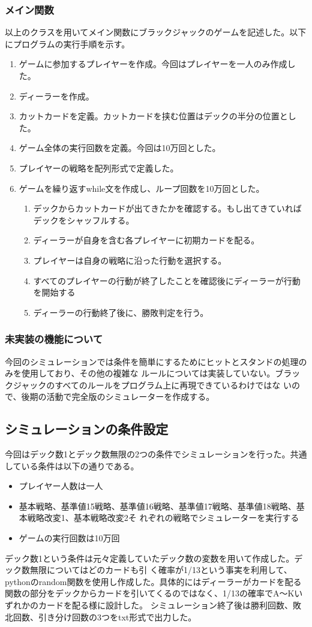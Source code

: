 \subsubsection{メイン関数}
以上のクラスを用いてメイン関数にブラックジャックのゲームを記述した。以下にプログラムの実行手順を示す。
\begin{enumerate}
    \item ゲームに参加するプレイヤーを作成。今回はプレイヤーを一人のみ作成した。
    \item ディーラーを作成。
    \item カットカードを定義。カットカードを挟む位置はデックの半分の位置とした。
    \item ゲーム全体の実行回数を定義。今回は10万回とした。
    \item プレイヤーの戦略を配列形式で定義した。
    \item ゲームを繰り返すwhile文を作成し、ループ回数を10万回とした。
    \begin{enumerate}
        \item デックからカットカードが出てきたかを確認する。もし出てきていればデックをシャッフルする。
	  \item ディーラーが自身を含む各プレイヤーに初期カードを配る。
	  \item プレイヤーは自身の戦略に沿った行動を選択する。
	  \item すべてのプレイヤーの行動が終了したことを確認後にディーラーが行動を開始する
	  \item ディーラーの行動終了後に、勝敗判定を行う。
    \end{enumerate}
\end{enumerate}

\subsubsection{未実装の機能について}
今回のシミュレーションでは条件を簡単にするためにヒットとスタンドの処理のみを使用しており、その他の複雑な
ルールについては実装していない。ブラックジャックのすべてのルールをプログラム上に再現できているわけではな
いので、後期の活動で完全版のシミュレーターを作成する。

\subsection{シミュレーションの条件設定}
今回はデック数1とデック数無限の2つの条件でシミュレーションを行った。共通している条件は以下の通りである。
\begin{itemize}
\item プレイヤー人数は一人
\item 基本戦略、基準値15戦略、基準値16戦略、基準値17戦略、基準値18戦略、基本戦略改変1、基本戦略改変2そ
れぞれの戦略でシミュレーターを実行する
\item ゲームの実行回数は10万回
\end{itemize}

デック数1という条件は元々定義していたデック数の変数を用いて作成した。デック数無限についてはどのカードも引
く確率が1/13という事実を利用して、pythonのrandom関数を使用し作成した。具体的にはディーラーがカードを配る
関数の部分をデックからカードを引いてくるのではなく、1/13の確率でA～Kいずれかのカードを配る様に設計した。
シミュレーション終了後は勝利回数、敗北回数、引き分け回数の3つをtxt形式で出力した。
